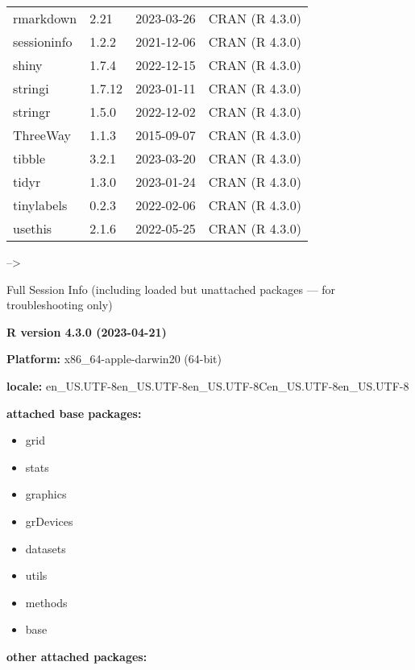 \documentclass[
]{article}
\providecommand{\tightlist}{%
  \setlength{\itemsep}{0pt}\setlength{\parskip}{0pt}}
\begin{document}
\begin{table}
\begin{tabular}[t]{llll}
rmarkdown & 2.21 & 2023-03-26 & CRAN (R 4.3.0)\\
sessioninfo & 1.2.2 & 2021-12-06 & CRAN (R 4.3.0)\\
shiny & 1.7.4 & 2022-12-15 & CRAN (R 4.3.0)\\
\addlinespace
stringi & 1.7.12 & 2023-01-11 & CRAN (R 4.3.0)\\
stringr & 1.5.0 & 2022-12-02 & CRAN (R 4.3.0)\\
ThreeWay & 1.1.3 & 2015-09-07 & CRAN (R 4.3.0)\\
tibble & 3.2.1 & 2023-03-20 & CRAN (R 4.3.0)\\
tidyr & 1.3.0 & 2023-01-24 & CRAN (R 4.3.0)\\
\addlinespace
tinylabels & 0.2.3 & 2022-02-06 & CRAN (R 4.3.0)\\
usethis & 2.1.6 & 2022-05-25 & CRAN (R 4.3.0)\\
\bottomrule
\end{tabular}
\end{table}

--\textgreater{}

Full Session Info (including loaded but unattached packages --- for
troubleshooting only)

\textbf{R version 4.3.0 (2023-04-21)}

\textbf{Platform:} x86\_64-apple-darwin20 (64-bit)

\textbf{locale:}
en\_US.UTF-8\textbar\textbar en\_US.UTF-8\textbar\textbar en\_US.UTF-8\textbar\textbar C\textbar\textbar en\_US.UTF-8\textbar\textbar en\_US.UTF-8

\textbf{attached base packages:}

\begin{itemize}
\tightlist
\item
  grid
\item
  stats
\item
  graphics
\item
  grDevices
\item
  datasets
\item
  utils
\item
  methods
\item
  base
\end{itemize}

\textbf{other attached packages:}
\end{document}
